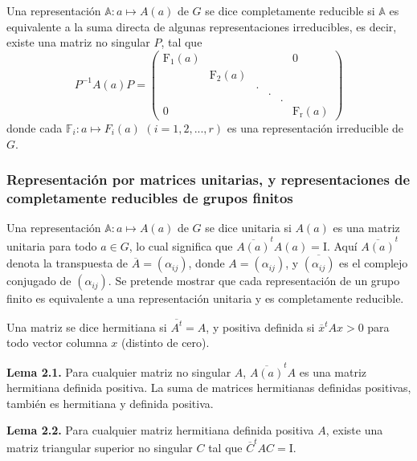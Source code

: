 \documentclass[12pt]{book}
\theoremstyle{definition}
\newcounter{in}
\newcounter{ini}
\begin{document}
Una representación $\mathbb{A}\colon a \mapsto A\left(a\right)$ de $G$
se dice completamente reducible si $\mathbb{A}$ es equivalente a la
suma directa de algunas representaciones irreducibles, es decir,
existe una matriz no singular $P$, tal que
\begin{equation*}
 P^{-1}A\left(a\right)P=
 \begin{pmatrix}
   \mathrm{F_{1}}\left(a\right) & & & & & 0\\
   & \mathrm{F_{2}}\left(a\right) & & & & \\
   & & . & & & \\
   & & & . & & \\
   & & & & . & \\
   0 & & & & & \mathrm{F_{r}}\left(a\right)
 \end{pmatrix}
\end{equation*}
donde cada $\mathbb{F}_{i}\colon a \mapsto F_{i}\left(a\right)$
$\left(i=1,2,...,r\right)$ es una representación irreducible de $G$.

\subsubsection{Representación por matrices unitarias, y
  representaciones de completamente reducibles de grupos finitos}
Una representación $\mathbb{A}\colon a \mapsto A\left(a\right)$ de $G$
se dice unitaria si $A\left(a\right)$ es una matriz unitaria para todo
$a \in G$, lo cual significa que
$\overline{A\left(a\right)}^{t}A\left(a\right)=\mathrm{I}$. Aquí
$\overline{A\left(a\right)}^{t}$ denota la transpuesta de
$\overline{A}=\left(\alpha_{ij}\right)$, donde
$A=\left(\alpha_{ij}\right)$, y $\overline{\left(\alpha_{ij}\right)}$
es el complejo conjugado de $\left(\alpha_{ij}\right)$. Se pretende
mostrar que cada representación de un grupo finito es equivalente a
una representación unitaria y es completamente reducible.

Una matriz se dice hermitiana si $\overline{A^{t}}=A$, y positiva
definida si $\overline{x}^{t}Ax>0$ para todo vector columna $x$
(distinto de cero).

\textbf{Lema 2.1.} Para cualquier matriz no singular $A$,
$\overline{A\left(a\right)}^{t}A$ es una matriz hermitiana definida
positiva. La suma de matrices hermitianas definidas positivas, también
es hermitiana y definida positiva.

\textbf{Lema 2.2.} Para cualquier matriz hermitiana definida positiva
$A$, existe una matriz triangular superior no singular $C$ tal que
$\overline{C}^{t}AC=\mathrm{I}$.
\end{document}

